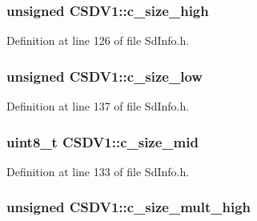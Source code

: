 \subsubsection[{\texorpdfstring{c\+\_\+size\+\_\+high}{c\_size\_high}}]{\setlength{\rightskip}{0pt plus 5cm}unsigned C\+S\+D\+V1\+::c\+\_\+size\+\_\+high}\hypertarget{struct_c_s_d_v1_a1db393dada90b094020d05ee296ae6e4}{}\label{struct_c_s_d_v1_a1db393dada90b094020d05ee296ae6e4}


Definition at line 126 of file Sd\+Info.\+h.

\subsubsection[{\texorpdfstring{c\+\_\+size\+\_\+low}{c\_size\_low}}]{\setlength{\rightskip}{0pt plus 5cm}unsigned C\+S\+D\+V1\+::c\+\_\+size\+\_\+low}\hypertarget{struct_c_s_d_v1_a31ff5166624ba6350bf13dc52ea66411}{}\label{struct_c_s_d_v1_a31ff5166624ba6350bf13dc52ea66411}


Definition at line 137 of file Sd\+Info.\+h.

\subsubsection[{\texorpdfstring{c\+\_\+size\+\_\+mid}{c\_size\_mid}}]{\setlength{\rightskip}{0pt plus 5cm}uint8\+\_\+t C\+S\+D\+V1\+::c\+\_\+size\+\_\+mid}\hypertarget{struct_c_s_d_v1_a3924209b2f4b13545821c70f350992e6}{}\label{struct_c_s_d_v1_a3924209b2f4b13545821c70f350992e6}


Definition at line 133 of file Sd\+Info.\+h.

\subsubsection[{\texorpdfstring{c\+\_\+size\+\_\+mult\+\_\+high}{c\_size\_mult\_high}}]{\setlength{\rightskip}{0pt plus 5cm}unsigned C\+S\+D\+V1\+::c\+\_\+size\+\_\+mult\+\_\+high}\hypertarget{struct_c_s_d_v1_a9a15f2200f682655454715f7f7940af4}{}\label{struct_c_s_d_v1_a9a15f2200f682655454715f7f7940af4}


